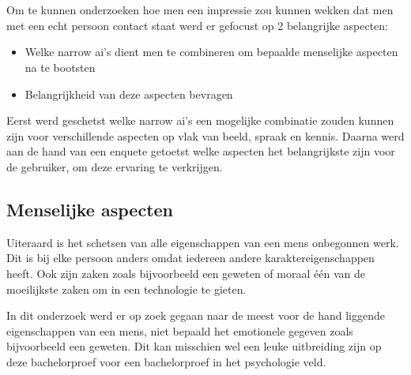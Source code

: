 
\chapter{}
\label{ch:methodologie}


Om te kunnen onderzoeken hoe men een impressie zou kunnen wekken dat men met een echt persoon contact staat werd er gefocust op 2 belangrijke aspecten:

\begin{itemize}
    \item Welke narrow ai's dient men te combineren om bepaalde menselijke aspecten na te bootsten
    \item Belangrijkheid van deze aspecten bevragen
\end{itemize}

Eerst werd geschetst welke narrow ai's een mogelijke combinatie zouden kunnen zijn voor verschillende aspecten op vlak van beeld, spraak en kennis. Daarna werd aan de hand van een enquete getoetst welke aspecten het belangrijkste zijn voor de gebruiker, om deze ervaring te verkrijgen.

\newpage

\section{Menselijke aspecten}

Uiteraard is het schetsen van alle eigenschappen van een mens onbegonnen werk. Dit is bij elke persoon anders omdat iedereen andere karaktereigenschappen heeft. Ook zijn zaken zoals bijvoorbeeld een geweten of moraal één van de moeilijkste zaken om in een technologie te gieten. 

In dit onderzoek werd er op zoek gegaan naar de meest voor de hand liggende eigenschappen van een mens, niet bepaald het emotionele gegeven zoals bijvoorbeeld een geweten. Dit kan misschien wel een leuke uitbreiding zijn op deze bachelorproef voor een bachelorproef in het psychologie veld.

